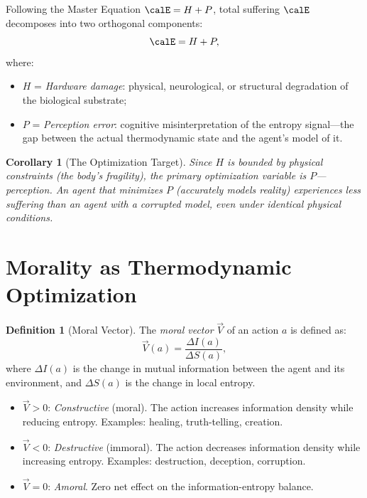 \documentclass[12pt, a4paper]{article}
\theoremstyle{plain}
\newtheorem{corollary}[theorem]{Corollary}
\theoremstyle{definition}
\newtheorem{definition}[theorem]{Definition}
\begin{document}
\begin{proposition}\label{prop:suffering}
  Following the Master Equation $\calE = H + P$, total suffering $\calE$
  decomposes into two orthogonal components:
  \begin{equation}\label{eq:suffering}
    \calE = H + P,
  \end{equation}
  where:
  \begin{itemize}
    \item $H$ = \emph{Hardware damage}: physical, neurological, or
      structural degradation of the biological substrate;
    \item $P$ = \emph{Perception error}: cognitive misinterpretation
      of the entropy signal---the gap between the actual thermodynamic
      state and the agent's model of it.
  \end{itemize}
\end{proposition}

\begin{corollary}[The Optimization Target]\label{cor:optimization}
  Since $H$ is bounded by physical constraints (the body's fragility),
  the primary optimization variable is $P$---\emph{perception}. An agent
  that minimizes $P$ (accurately models reality) experiences less
  suffering than an agent with a corrupted model, even under identical
  physical conditions.
\end{corollary}

\section{Morality as Thermodynamic Optimization}\label{sec:morality}

\begin{definition}[Moral Vector]\label{def:moral}
  The \emph{moral vector} $\vec{V}$ of an action $a$ is defined as:
  \begin{equation}\label{eq:moral}
    \vec{V}(a) = \frac{\Delta I(a)}{\Delta S(a)},
  \end{equation}
  where $\Delta I(a)$ is the change in mutual information between the
  agent and its environment, and $\Delta S(a)$ is the change in local
  entropy.
  \begin{itemize}
    \item $\vec{V} > 0$: \emph{Constructive} (moral). The action
      increases information density while reducing entropy. Examples:
      healing, truth-telling, creation.
    \item $\vec{V} < 0$: \emph{Destructive} (immoral). The action
      decreases information density while increasing entropy. Examples:
      destruction, deception, corruption.
    \item $\vec{V} = 0$: \emph{Amoral}. Zero net effect on the
      information-entropy balance.
  \end{itemize}
\end{definition}
\end{document}
